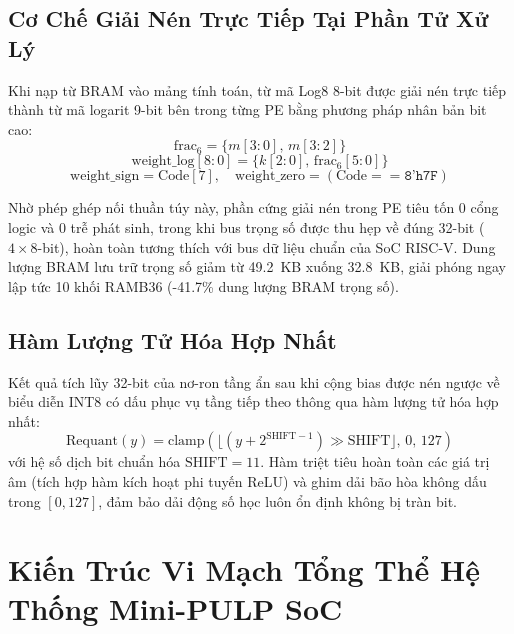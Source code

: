 \documentclass[conference]{IEEEtran}
\begin{document}
\subsection{Cơ Chế Giải Nén Trực Tiếp Tại Phần Tử Xử Lý}
\hspace*{1em} Khi nạp từ BRAM vào mảng tính toán, từ mã Log8 8-bit được giải nén trực tiếp thành từ mã logarit 9-bit bên trong từng PE bằng phương pháp nhân bản bit cao:
\begin{equation}
    \text{frac}_6 = \{ m[3:0],\, m[3:2] \}
\end{equation}
\begin{equation}
    \text{weight\_log}[8:0] = \{ k[2:0],\, \text{frac}_6[5:0] \}
\end{equation}
\begin{equation}
    \text{weight\_sign} = \text{Code}[7], \quad \text{weight\_zero} = (\text{Code} == \texttt{8'h7F})
\end{equation}

Nhờ phép ghép nối thuần túy này, phần cứng giải nén trong PE tiêu tốn 0 cổng logic và 0 trễ phát sinh, trong khi bus trọng số được thu hẹp về đúng 32-bit ($4 \times 8$-bit), hoàn toàn tương thích với bus dữ liệu chuẩn của SoC RISC-V. Dung lượng BRAM lưu trữ trọng số giảm từ 49.2~KB xuống 32.8~KB, giải phóng ngay lập tức 10 khối RAMB36 (-41.7\% dung lượng BRAM trọng số).

\subsection{Hàm Lượng Tử Hóa Hợp Nhất}
\hspace*{1em} Kết quả tích lũy 32-bit của nơ-ron tầng ẩn sau khi cộng bias được nén ngược về biểu diễn INT8 có dấu phục vụ tầng tiếp theo thông qua hàm lượng tử hóa hợp nhất:
\begin{equation}
    \text{Requant}(y) = \text{clamp}\left( \lfloor (y + 2^{\text{SHIFT}-1}) \gg \text{SHIFT} \rfloor,\, 0,\, 127 \right)
\end{equation}
với hệ số dịch bit chuẩn hóa $\text{SHIFT} = 11$. Hàm triệt tiêu hoàn toàn các giá trị âm (tích hợp hàm kích hoạt phi tuyến ReLU) và ghim dải bão hòa không dấu trong $[0, 127]$, đảm bảo dải động số học luôn ổn định không bị tràn bit.

\section{Kiến Trúc Vi Mạch Tổng Thể Hệ Thống Mini-PULP SoC}
\label{sec:soc_arch}
\end{document}
